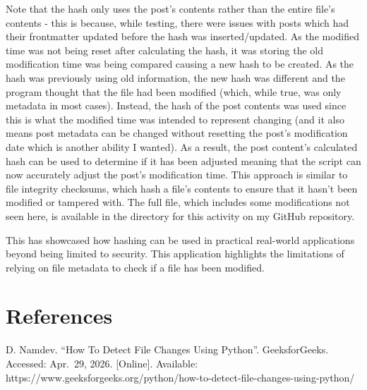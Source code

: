 Note that the hash only uses the post's contents rather than the entire
file's contents - this is because, while testing, there were issues with
posts which had their frontmatter updated before the hash was
inserted/updated. As the modified time was not being reset after
calculating the hash, it was storing the old modification time was being
compared causing a new hash to be created. As the hash was previously
using old information, the new hash was different and the program
thought that the file had been modified (which, while true, was only
metadata in most cases). Instead, the hash of the post contents was used
since this is what the modified time was intended to represent changing
(and it also means post metadata can be changed without resetting the
post's modification date which is another ability I wanted). As a
result, the post content's calculated hash can be used to determine if
it has been adjusted meaning that the script can now accurately adjust
the post's modification time. This approach is similar to file integrity
checksums, which hash a file's contents to ensure that it hasn't been
modified or tampered with. The full file, which includes some
modifications not seen here, is available in the directory for this
activity on my GitHub repository.

This has showcased how hashing can be used in practical real-world
applications beyond being limited to security. This application
highlights the limitations of relying on file metadata to check if a
file has been modified.

\hypertarget{references}{%
\section{References}\label{references}}

D. Namdev. ``How To Detect File Changes Using Python''. GeeksforGeeks.
Accessed: Apr.~29, 2026. {[}Online{]}. Available:
https://www.geeksforgeeks.org/python/how-to-detect-file-changes-using-python/
